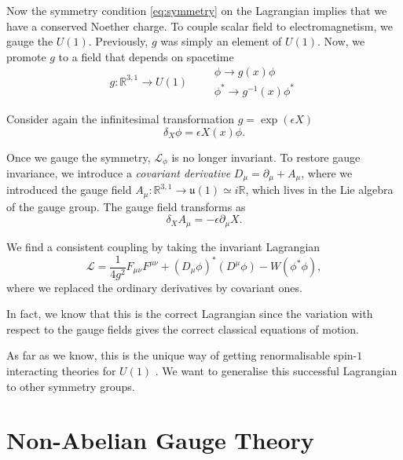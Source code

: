 
Now the symmetry condition \eqref{eq:symmetry} on the Lagrangian implies that we have a conserved Noether charge.
To couple scalar field to electromagnetism, we gauge the $U(1)$.
Previously, $g$ was simply an element of $U(1)$. Now, we promote $g$ to a field that depends on spacetime
\begin{equation}
  g\colon \mathbb{R}^{3, 1} \to {U}(1) \qquad
  \begin{gathered}
    \phi \to g(x) \phi \\
    \phi^* \to g^{-1}(x) \phi^*
  \end{gathered}
\end{equation}

Consider again the infinitesimal transformation $g = \exp(\epsilon X)$
\begin{equation}
  \delta_X \phi = \epsilon X(x) \phi.
\end{equation}

Once we gauge the symmetry, $\mathcal{L}_\phi$ is no longer invariant. To restore gauge invariance, we introduce a \emph{covariant derivative} $D_{\mu} = \partial_{\mu} + A_{\mu}$, where we introduced the gauge field $A_{\mu}\colon \mathbb{R}^{3, 1} \to \mathfrak{u}(1) \simeq i \mathbb{R}$, which lives in the Lie algebra of the gauge group.
The gauge field transforms as
\begin{equation}
  \delta_X A_{\mu} = - \epsilon \partial_{\mu} X.
\end{equation}

We find a consistent coupling by taking the invariant Lagrangian
\begin{equation}
  \mathcal{L} = \frac{1}{4 g^2} F_{\mu\nu} F^{\mu\nu} + (D_{\mu} \phi)^* (D^{\mu} \phi) - W(\phi^* \phi),
\end{equation}
where we replaced the ordinary derivatives by covariant ones.

In fact, we know that this is the correct Lagrangian since the variation with respect to the gauge fields gives the correct classical equations of motion.

As far as we know, this is the unique way of getting renormalisable spin-$1$ interacting theories for $U(1)$ .
We want to generalise this successful Lagrangian to other symmetry groups.

\section{Non-Abelian Gauge Theory}%
\label{sec:non_abelian_gauge_theory}

